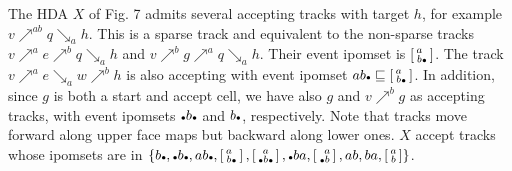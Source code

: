 The HDA $X$ of Fig. 7 admits several accepting tracks with target $h$, for example $v\mathrel{\nearrow^{ab}}q\mathrel{\searrow_{a}}h$. This is a sparse track and equivalent to the non-sparse tracks $v\mathrel{\nearrow^{a}}e\mathrel{\nearrow^{b}}q\mathrel{\searrow_{a}}h$ and $v\mathrel{\nearrow^{b}}g\mathrel{\nearrow^{a}}q\mathrel{\searrow_{a}}h$. Their event ipomset is $\left[\begin{smallmatrix}a\hphantom{\vbox{\hbox{\tiny$\bullet$}}}\\
b\vbox{\hbox{\tiny$\bullet$}}\end{smallmatrix}\right]$. The track $v\mathrel{\nearrow^{a}}e\mathrel{\searrow_{a}}w\mathrel{\nearrow^{b}}h$ is also accepting with event ipomset $ab\vbox{\hbox{\tiny$\bullet$}}\sqsubseteq\left[\begin{smallmatrix}a\hphantom{\vbox{\hbox{\tiny$\bullet$}}}\\
b\vbox{\hbox{\tiny$\bullet$}}\end{smallmatrix}\right]$. In addition, since $g$ is both a start and accept cell, we have also $g$ and $v\mathrel{\nearrow^{b}}g$ as accepting tracks, with event ipomsets $\vbox{\hbox{\tiny$\bullet$}}b\vbox{\hbox{\tiny$\bullet$}}$ and $b\vbox{\hbox{\tiny$\bullet$}}$, respectively. Note that tracks move forward along upper face maps but backward along lower ones. $X$ accept tracks whose ipomsets are in ${\{b\vbox{\hbox{\tiny$\bullet$}},\vbox{\hbox{\tiny$\bullet$}}b\vbox{\hbox{\tiny$\bullet$}},ab\vbox{\hbox{\tiny$\bullet$}},\left[\begin{smallmatrix}a\hphantom{\vbox{\hbox{\tiny$\bullet$}}}\\
b\vbox{\hbox{\tiny$\bullet$}}\end{smallmatrix}\right],\left[\begin{smallmatrix}a\\
\vbox{\hbox{\tiny$\bullet$}}b\vbox{\hbox{\tiny$\bullet$}}\end{smallmatrix}\right],\vbox{\hbox{\tiny$\bullet$}}ba,\left[\begin{smallmatrix}\hphantom{\vbox{\hbox{\tiny$\bullet$}}}a\\
\vbox{\hbox{\tiny$\bullet$}}b\end{smallmatrix}\right],ab,ba,\left[\begin{smallmatrix}a\\
b\end{smallmatrix}\right]\}}$.\par
 
 
